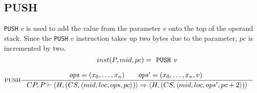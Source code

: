 \subsection{PUSH}
\texttt{PUSH} $v$ is used to add the value from the parameter $v$ onto the top of the operand stack. Since the \texttt{PUSH} $v$ instruction takes up two bytes due to the parameter, $pc$ is incremented by two.
$$\inference[PUSH]{
inst(P, mid, pc) = \texttt{PUSH }v \semnl\\
 ops = (x_0,\ldots,x_n) \semsp ops' = (x_0, \ldots, x_n, v) \ }
{CP, P \vdash \langle H, (CS, \langle mid, loc, ops, pc \rangle)\rangle \Rightarrow
 \langle H, (CS, \langle mid, loc, ops', pc + 2 \rangle)\rangle}$$\\
